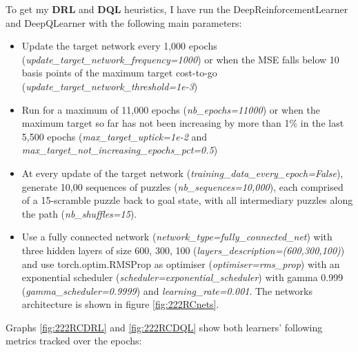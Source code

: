 \label{sec:S33DRL}
To get my \textbf{DRL} and \textbf{DQL} heuristics, I have run the DeepReinforcementLearner and DeepQLearner with the following main parameters:
\begin{itemize}
\item Update the target network every 1,000 epochs (\textit{update\_target\_network\_frequency=1000}) or when the MSE falls below 10 basis points of the maximum target cost-to-go (\textit{update\_target\_network\_threshold=1e-3})
\item Run for a maximum of 11,000 epochs (\textit{nb\_epochs=11000}) or when the maximum target so far has not been increasing by more than 1\% in the last 5,500 epochs (\textit{max\_target\_uptick=1e-2} and \textit{max\_target\_not\_increasing\_epochs\_pct=0.5})
\item At every update of the target network (\textit{training\_data\_every\_epoch=False}), generate 10,00 sequences of puzzles (\textit{nb\_sequences=10,000}), each comprised of a 15-scramble puzzle back to goal state, with all intermediary puzzles along the path (\textit{nb\_shuffles=15}).
\item Use a fully connected network (\textit{network\_type=fully\_connected\_net}) with three hidden layers of size 600, 300, 100 (\textit{layers\_description=(600,300,100)}) and use torch.optim.RMSProp as optimiser (\textit{optimiser=rms\_prop}) with an exponential scheduler (\textit{scheduler=exponential\_scheduler}) with gamma 0.999 (\textit{gamma\_scheduler=0.9999}) and \textit{learning\_rate=0.001}. The networks architecture is shown in figure \ref{fig:222RCnets}.
\end{itemize}
Graphs \ref{fig:222RCDRL} and \ref{fig:222RCDQL} show both learners' following metrics tracked over the epochs:

